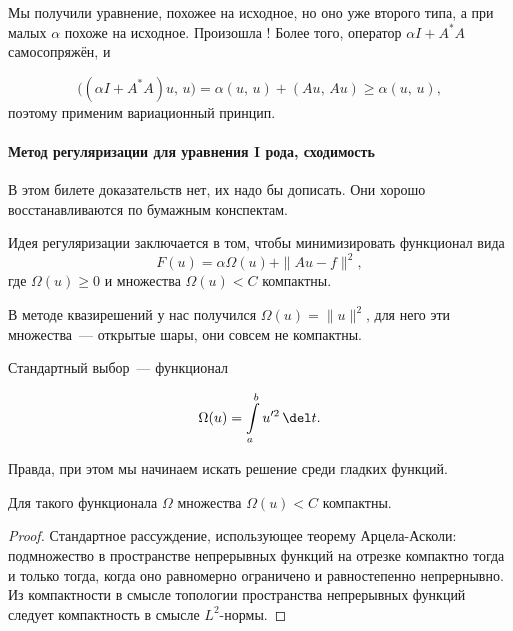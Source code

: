\documentclass{trlnotes}
\begin{document}
    Мы получили уравнение, похожее на исходное, но оно уже второго типа, а при малых $\alpha$ похоже на исходное. Произошла ! Более того, оператор $\alpha I + A^*A$ самосопряжён, и

    \[
        \big((\alpha I + A^*A)u, \, u\big) = \alpha(u, \, u) + (Au, \, Au) \geqslant \alpha(u, \, u),
    \]
    поэтому применим вариационный принцип.



\paragraph{Метод регуляризации для уравнения I рода, сходимость}


    \begin{rem}
        В этом билете доказательств нет, их надо бы дописать. Они хорошо восстанавливаются по бумажным конспектам.
    \end{rem}

    Идея регуляризации заключается в том, чтобы минимизировать функционал вида
    \[
        F(u) = \alpha \Omega(u) + \|Au - f\|^2,
    \]
    где $\Omega(u) \geqslant 0$ и множества $\Omega(u) < C$ компактны.

    \begin{rem}
        В методе квазирешений у нас получился $\Omega(u) = \|u\|^2$, для него эти множества~--- открытые шары, они совсем не компактны.
    \end{rem}

    Стандартный выбор~--- функционал

    \[
        \Omega(u) = \int\limits_a^b u'^2 \, \del t.
    \]

    Правда, при этом мы начинаем искать решение среди гладких функций.

    \begin{st}
        Для такого функционала $\Omega$ множества $\Omega(u) < C$ компактны.
        \begin{proof}
            Стандартное рассуждение, использующее теорему Арцела-Асколи: подмножество в пространстве непрерывных функций на отрезке компактно тогда и только тогда, когда оно равномерно ограничено и равностепенно непрернывно. Из компактности в смысле топологии пространства непрерывных функций следует компактность в смысле $L^2$-нормы.
        \end{proof}
    \end{st}
\end{document}
